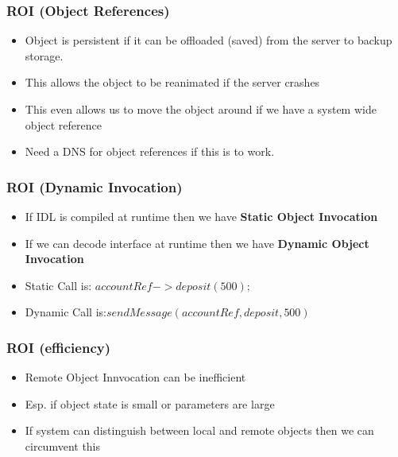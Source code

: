 \documentclass{beamer}
\begin{document}
            \begin{frame}
            	\frametitle{ROI (Object References)}
            	\begin{itemize}
            		\item Object is persistent if it can be offloaded (saved) from the server to backup storage. 
            		\item This allows the object to be reanimated if the server crashes
            		\item This even allows us to move the object around if we have a system wide object reference
            		\item Need a DNS for object references if this is to work.
            	\end{itemize}
            \end{frame}
      \begin{frame}
      	\frametitle{ROI (Dynamic Invocation)}
      	\begin{itemize}
      		\item If IDL is compiled at runtime then we have\textbf{ Static Object Invocation}
      		\item If we can decode interface at runtime then we have \textbf{Dynamic Object Invocation}
      		\item Static Call is:  $accountRef->deposit(500);$
      		\item Dynamic Call is:$sendMessage(accountRef,deposit,500)$
      	\end{itemize}
      \end{frame}      
      \begin{frame}
      	\frametitle{ROI (efficiency)}
      	\begin{itemize}
      		\item Remote Object Innvocation can be inefficient
      		\item Esp. if object state is small or parameters are large
      		\item If system can distinguish between local and remote objects then we can circumvent this
      	\end{itemize}
      \end{frame}  
\end{document}
